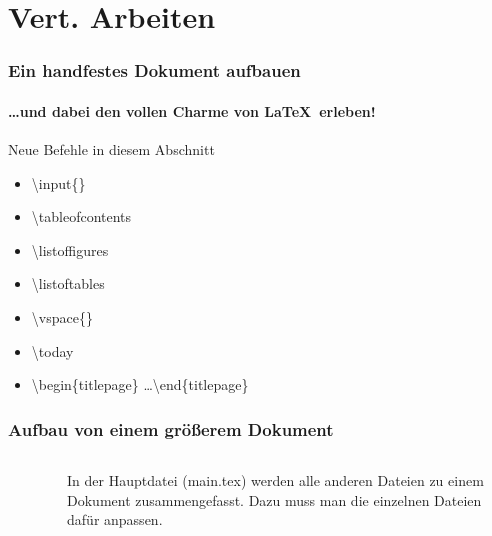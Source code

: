 \section{Vert. Arbeiten}
\begin{frame}
\frametitle{Ein handfestes Dokument aufbauen}
\framesubtitle{\ldots und dabei den vollen Charme von \LaTeX ~erleben!}
\begin{block}{Neue Befehle in diesem Abschnitt}
\begin{itemize}
  \item \color{nounibaredI}\textbackslash input\color{black}\{\}
  \item \color{nounibaredI}\textbackslash tableofcontents\color{black}
  \item \color{nounibaredI}\textbackslash listoffigures\color{black}
  \item \color{nounibaredI}\textbackslash listoftables\color{black}
  \item \color{nounibaredI}\textbackslash vspace\color{black}\{\}
  \item \color{nounibaredI}\textbackslash today\color{black}
\item \color{unibablueI}\textbackslash begin\color{black}\{titlepage\} \ldots \color{unibablueI}\textbackslash end\color{black}\{titlepage\} 
\end{itemize}
\end{block}
\end{frame}


\begin{frame}
\frametitle{Aufbau von einem gr\"o\ss erem Dokument}

\begin{columns}
\begin{column}{.5\textwidth}
\footnotesize
\begin{figure}[t]
\end{figure}
\end{column}
\begin{column}{.5\textwidth}
In der Hauptdatei (main.tex) werden alle anderen Dateien zu einem Dokument zusammengefasst. 
Dazu muss man die einzelnen Dateien daf\"ur anpassen.
\end{column}
\end{columns}
\end{frame}

